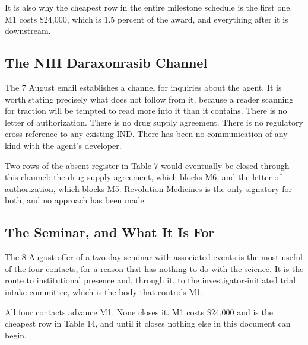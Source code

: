 It is also why the cheapest row in the entire milestone schedule is the first
one. M1 costs \$24,000, which is 1.5 percent of the award, and everything after
it is downstream.

\subsection{The NIH Daraxonrasib Channel}

The 7 August email establishes a channel for inquiries about the agent. It is
worth stating precisely what does not follow from it, because a reader scanning
for traction will be tempted to read more into it than it contains. There is no
letter of authorization. There is no drug supply agreement. There is no
regulatory cross-reference to any existing IND. There has been no communication
of any kind with the agent's developer.

Two rows of the absent register in Table 7 would eventually be closed through
this channel: the drug supply agreement, which blocks M6, and the letter of
authorization, which blocks M5. Revolution Medicines is the only signatory for
both, and no approach has been made.

\subsection{The Seminar, and What It Is For}

The 8 August offer of a two-day seminar with associated events is the most
useful of the four contacts, for a reason that has nothing to do with the
science. It is the route to institutional presence and, through it, to the
investigator-initiated trial intake committee, which is the body that controls
M1.

All four contacts advance M1. None closes it. M1 costs \$24,000 and is the
cheapest row in Table 14, and until it closes nothing else in this document can
begin.
